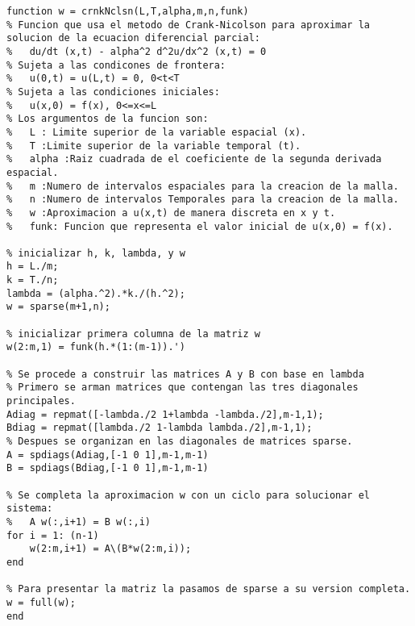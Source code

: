 \documentclass[11pt]{article} %
\begin{document}
\begin{lstlisting}[style=Matlab-editor]
function w = crnkNclsn(L,T,alpha,m,n,funk)
% Funcion que usa el metodo de Crank-Nicolson para aproximar la solucion de la ecuacion diferencial parcial:
%	du/dt (x,t) - alpha^2 d^2u/dx^2 (x,t) = 0
% Sujeta a las condicones de frontera:
%	u(0,t) = u(L,t) = 0, 0<t<T
% Sujeta a las condiciones iniciales:
%	u(x,0) = f(x), 0<=x<=L
% Los argumentos de la funcion son:
%	L : Limite superior de la variable espacial (x).
%	T :Limite superior de la variable temporal (t).
%	alpha :Raiz cuadrada de el coeficiente de la segunda derivada espacial.
%	m :Numero de intervalos espaciales para la creacion de la malla.
%	n :Numero de intervalos Temporales para la creacion de la malla.
%	w :Aproximacion a u(x,t) de manera discreta en x y t.
%	funk: Funcion que representa el valor inicial de u(x,0) = f(x).

% inicializar h, k, lambda, y w
h = L./m;
k = T./n;
lambda = (alpha.^2).*k./(h.^2);
w = sparse(m+1,n);

% inicializar primera columna de la matriz w
w(2:m,1) = funk(h.*(1:(m-1)).')

% Se procede a construir las matrices A y B con base en lambda
% Primero se arman matrices que contengan las tres diagonales principales.
Adiag = repmat([-lambda./2 1+lambda -lambda./2],m-1,1);
Bdiag = repmat([lambda./2 1-lambda lambda./2],m-1,1);
% Despues se organizan en las diagonales de matrices sparse.
A = spdiags(Adiag,[-1 0 1],m-1,m-1)
B = spdiags(Bdiag,[-1 0 1],m-1,m-1)

% Se completa la aproximacion w con un ciclo para solucionar el sistema:
%	A w(:,i+1) = B w(:,i)
for i = 1: (n-1)
	w(2:m,i+1) = A\(B*w(2:m,i));
end

% Para presentar la matriz la pasamos de sparse a su version completa.
w = full(w);
end
\end{lstlisting}
\end{document}
